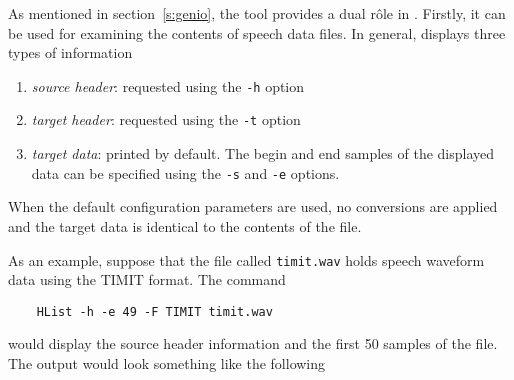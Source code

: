 
As mentioned in section~\ref{s:genio}, the tool  provides
a dual r\^{o}le in \HTK.  Firstly, it can be used for examining the contents
of speech data files.  
In general,  displays three types of information
\begin{enumerate}
 \item \textit{source header}: requested using the \texttt{-h} option
 \item \textit{target header}: requested using the \texttt{-t} option
 \item \textit{target data}: printed by default.  The begin and end samples of the
displayed data can be specified using the \texttt{-s} and \texttt{-e} options.
\end{enumerate}
When the default configuration parameters are used, 
no conversions are applied and the target
data is identical to the contents of the file.  

As an example, suppose that the file called \texttt{timit.wav} holds speech
waveform data using the TIMIT format.  The command
\begin{verbatim}
    HList -h -e 49 -F TIMIT timit.wav
\end{verbatim}
would display the source header information and the first 50 samples of the
file.  The output would look something like the following

